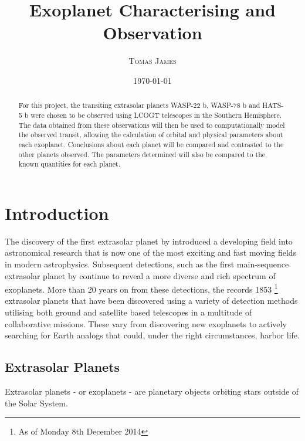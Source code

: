 \documentclass{article}
\title{Exoplanet Characterising and Observation}
\author{\textsc{Tomas James}}
\begin{document}
\date{\today}


\maketitle

\label{firstpage}


\begin{abstract}
For this project, the transiting extrasolar planets WASP-22 b, WASP-78 b and HATS-5 b were chosen to be observed using LCOGT telescopes in the Southern Hemisphere. The data obtained from these observations will then be used to computationally model the observed transit, allowing the calculation of orbital and physical parameters about each exoplanet. Conclusions about each planet will be compared and contrasted to the other planets observed. The parameters determined will also be compared to the known quantities for each planet.
\end{abstract}


\section{Introduction}
The discovery of the first extrasolar planet by \textcite{first} introduced a developing field into astronomical research that is now one of the most exciting and fast moving fields in modern astrophysics. Subsequent detections, such as the first main-sequence extrasolar planet by \textcite{MQ} continue to reveal a more diverse and rich spectrum of exoplanets. More than 20 years on from these detections, the \textcite{exo} records 1853 \footnote{As of Monday 8th December 2014} extrasolar planets that have been discovered using a variety of detection methods utilising both ground and satellite based telescopes in a multitude of collaborative missions. These vary from discovering new exoplanets to actively searching for Earth analogs that could, under the right circumstances, harbor life.

\subsection{Extrasolar Planets}
Extrasolar planets - or exoplanets - are planetary objects orbiting stars outside of the Solar System.  
\end{document}

